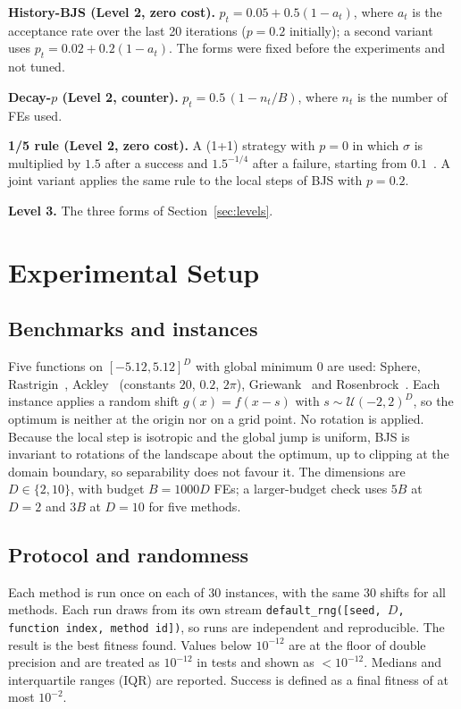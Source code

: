 \documentclass[conference]{IEEEtran}
\begin{document}
\textbf{History-BJS (Level 2, zero cost).} $p_t=0.05+0.5(1-a_t)$, where $a_t$ is the acceptance rate over the last 20 iterations ($p=0.2$ initially); a second variant uses $p_t=0.02+0.2(1-a_t)$. The forms were fixed before the experiments and not tuned.

\textbf{Decay-$p$ (Level 2, counter).} $p_t=0.5\,(1-n_t/B)$, where $n_t$ is the number of FEs used.

\textbf{1/5 rule (Level 2, zero cost).} A (1+1) strategy with $p=0$ in which $\sigma$ is multiplied by $1.5$ after a success and $1.5^{-1/4}$ after a failure, starting from $0.1$~\cite{rechenberg1973,schumer1968}. A joint variant applies the same rule to the local steps of BJS with $p=0.2$.

\textbf{Level 3.} The three forms of Section~\ref{sec:levels}.

\section{Experimental Setup}
\subsection{Benchmarks and instances}
Five functions on $[-5.12,5.12]^D$ with global minimum $0$ are used: Sphere, Rastrigin~\cite{torn1989}, Ackley~\cite{ackley1987} (constants $20$, $0.2$, $2\pi$), Griewank~\cite{griewank1981} and Rosenbrock~\cite{rosenbrock1960}. Each instance applies a random shift $g(x)=f(x-s)$ with $s\sim\mathcal{U}(-2,2)^D$, so the optimum is neither at the origin nor on a grid point. No rotation is applied. Because the local step is isotropic and the global jump is uniform, BJS is invariant to rotations of the landscape about the optimum, up to clipping at the domain boundary, so separability does not favour it. The dimensions are $D\in\{2,10\}$, with budget $B=1000D$ FEs; a larger-budget check uses $5B$ at $D=2$ and $3B$ at $D=10$ for five methods.

\subsection{Protocol and randomness}
Each method is run once on each of 30 instances, with the same 30 shifts for all methods. Each run draws from its own stream \texttt{default\_rng([seed, $D$, function index, method id])}, so runs are independent and reproducible. The result is the best fitness found. Values below $10^{-12}$ are at the floor of double precision and are treated as $10^{-12}$ in tests and shown as $<10^{-12}$. Medians and interquartile ranges (IQR) are reported. Success is defined as a final fitness of at most $10^{-2}$.
\end{document}
